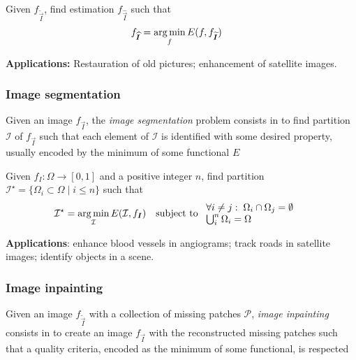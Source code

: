 Given $f_{\widetilde{\vec{I}}}$, find estimation $f_{\widehat{\vec{I}}}$ such that
\begin{align*}
	f_{\widehat{\bm{I}}} &= \operatorname*{arg\,min}_f E(f,f_{\bm{\widetilde{I}}})
\end{align*}

\textbf{Applications:} Restauration of old pictures; enhancement of satellite images.

\subsubsection{Image segmentation}
Given an image $f_{\vec{I}}$, the \emph{image segmentation} problem consists in to find partition $\mathcal{I}$ of $f_{\vec{I}}$ such that each element of $\mathcal{I}$ is identified with some desired property, usually encoded by the minimum of some functional $E$

%

Given $f_I:\Omega \rightarrow [0,1]$ and a positive integer $n$, find partition $\mathcal{I}^{\star} = \{ \Omega_i \subset \Omega \; | \; i \leq n \}$ such that
\begin{align*}
	\mathcal{I}^{\star} = \operatorname*{arg\,min}_{\mathcal{I}} E(\mathcal{I},f_{\bm{I}}) &\quad  \text{subject to } \begin{array}{l}
	\forall i\neq j:\; \Omega_i \cap \Omega_j = \emptyset\\ 
	\bigcup_i^{n} \Omega_i = \Omega
	\end{array}
\end{align*}

\textbf{Applications}: enhance blood vessels in angiograms; track roads in satellite images; identify objects in a scene. 



\subsubsection{Image inpainting}
Given an image $f_{\widetilde{\vec{I}}}$ with a collection of missing patches $\mathcal{P}$, \emph{image inpainting} consists in to create an image $f_{\vec{I}}$ with the reconstructed missing patches such that a quality criteria, encoded as the minimum of some functional, is respected

